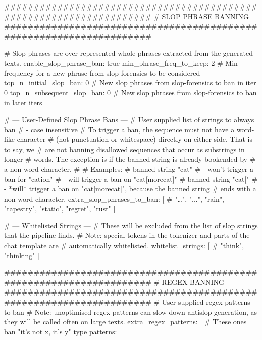\documentclass[11pt]{article}
\begin{document}
\begin{cfgblock}
####################################################################
# SLOP PHRASE BANNING
####################################################################

# Slop phrases are over-represented whole phrases extracted from the generated texts.
enable_slop_phrase_ban: true
min_phrase_freq_to_keep: 2 # Min frequency for a new phrase from slop-forensics to be considered
top_n_initial_slop_ban: 0 # New slop phrases from slop-forensics to ban in iter 0
top_n_subsequent_slop_ban: 0 # New slop phrases from slop-forensics to ban in later iters

# --- User-Defined Slop Phrase Bans ---
# User supplied list of strings to always ban
# - case insensitive
# To trigger a ban, the sequence must not have a word-like character
#    (not punctuation or whitespace) directly on either side. That is to say, we
#    are not banning disallowed sequences that occur as substrings in longer
#    words. The exception is if the banned string is already bookended by
#    a non-word character.
#
#    Examples:
#    banned string "cat"
#      - won't trigger a ban for "cation"
#     - will trigger a ban on "cat[morecat]"
#   banned string "cat["
#     - *will* trigger a ban on "cat[morecat]", because the banned string
#        ends with a non-word character.
extra_slop_phrases_to_ban: [
  # "…", "...", "rain", "tapestry", "static", "regret", "rust"
]

# --- Whitelisted Strings ---
# These will be excluded from the list of slop strings that the pipeline finds.
# Note: special tokens in the tokenizer and parts of the chat template are
#       automatically whitelisted.
whitelist_strings: [
  # "think", "thinking"
]

####################################################################
# REGEX BANNING
####################################################################
# User-supplied regex patterns to ban
# Note: unoptimised regex patterns can slow down antislop generation, as they will be called often on large texts.
extra_regex_patterns: [
  # These ones ban "it's not x, it's y" type patterns:
    

\end{cfgblock}
\end{document}

